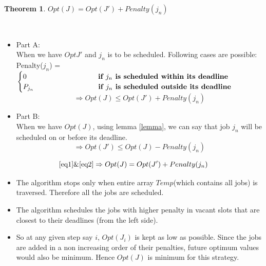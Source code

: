 \documentclass[pdftex,a4paper,12pt]{report}
\newtheorem{theorem}{Theorem}[section]
\newenvironment{proof}[1][Proof]{\begin{trivlist}
\item[\hskip \labelsep {\bfseries #1}]}{\end{trivlist}}
\begin{document}
\begin{theorem}
\label{theorem}
$Opt(J) = Opt(J')+Penalty(j_{n})$
\end{theorem}
\begin{proof}
\mbox{}\\
\begin{itemize}
\item Part A:
\\ When we have $Opt{J'}$ and $j_{n}$ is to be scheduled. Following cases are possible:\\
Penalty($j_{n}$) = 
					$\begin{cases}
					0 \makebox[100pt]{}\textbf{if $j_{n}$ is scheduled within its deadline}\\
					\texttt{$P_{j_{n}}$} \makebox[90pt]{}\textbf{if $j_{n}$ is scheduled outside its deadline}\\
					\end{cases}$
					\\
\begin{equation}
\label{eq1}
\Rightarrow Opt(J) \leq Opt(J') + Penalty(j_{n})
\end{equation}
\item Part B:\\
 When we have $Opt(J)$, using lemma \ref{lemma}, we can say that job $j_{n}$ will be scheduled on or before its deadline.\\
\begin{equation}
\label{eq2}
 \Rightarrow Opt(J') \leq Opt(J) - Penalty(j_{n})
\end{equation} 
\end{itemize}
\begin{equation}
\ref{eq1} \& \ref{eq2} \Rightarrow Opt(J) = Opt(J')+Penalty(j_{n})
\end{equation}
\end{proof}
\begin{itemize}
\item The algorithm stops only when entire array $Temp$(which contains all jobs) is traversed. Therefore all the jobs are scheduled.
\item The algorithm schedules the jobs with higher penalty in vacant slots that are closest to their deadlines (from the left side).
\item So at any given step say $i$, $Opt(J_{i})$ is kept as low as possible. Since the jobs are added in a non increasing order of their penalties, future optimum values would also be minimum. Hence $Opt(J)$ is minimum for this strategy. 
\end{itemize}
\end{document}
